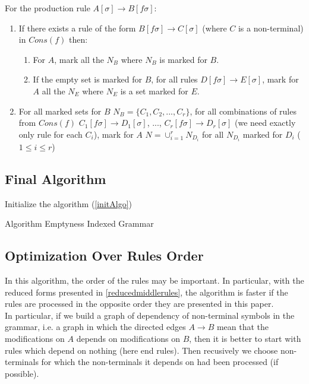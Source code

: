 For the production rule $A[\sigma] \rightarrow B[f \sigma]$:
\begin{enumerate}
\item If there exists a rule of the form $B[f \sigma] \rightarrow C[\sigma]$ (where $C$ is a non-terminal) in $Cons(f)$ then:
\begin{enumerate}
\item For $A$, mark all the $N_B$ where $N_B$ is marked for $B$.
\item If the empty set is marked for $B$, for all rules $D[f \sigma] \rightarrow E[\sigma]$, mark for $A$ all the $N_E$ where $N_E$ is a set marked for $E$.
\end{enumerate}
\item For all marked sets for $B$ $N_B = \{C_1, C_2, ..., C_r\}$, for all combinations of rules from $Cons(f)$ $C_1[f \sigma] \rightarrow D_1[\sigma]$, ..., $C_r[f \sigma] \rightarrow D_r[\sigma]$ (we need exactly only rule for each $C_i$), mark for $A$ $N = \cup_{i=1}^{r} N_{D_i}$ for all $N_{D_i}$ marked for $D_i$ ($1 \leq i \leq r$)
\end{enumerate}

\subsection{Final Algorithm}

\begin{algorithm}[]
\SetAlgoLined
{}
Initialize the algorithm (\ref{initAlgo})\;
 \caption{Algorithm Emptyness Indexed Grammar}
 \label{algoEmptyness}
\end{algorithm}

\subsection{Optimization Over Rules Order}

In this algorithm, the order of the rules may be important. In particular, with the reduced forms presented in \ref{reducedmiddlerules}, the algorithm is faster if the rules are processed in the opposite order they are presented in this paper.\\

In particular, if we build a graph of dependency of non-terminal symbols in the grammar, i.e. a graph in which the directed edges $A \rightarrow B$ mean that the modifications on $A$ depends on modifications on $B$, then it is better to start with rules which depend on nothing (here end rules). Then recusively we choose non-terminals for which the non-terminals it depends on had been processed (if possible).\\


